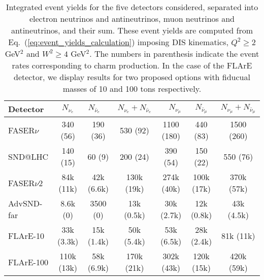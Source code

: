 \begin{table}[t]
  \centering
  \small
  \renewcommand{\arraystretch}{1.70}
\begin{tabularx}{\textwidth}{X|c|c|c|c|c|c}
\toprule
Detector & $\quad$ $N_{\nu_e}$ $\quad$ &$\quad$ $N_{\bar{\nu}_e}$$\quad$   &   $N_{\nu_e} + N_{\bar{\nu}_e}$ &
$\quad$$N_{\nu_\mu}$ $\quad$ & $\quad$ $N_{\bar{\nu}_\mu}$ $\quad$  &   $N_{\nu_\mu} + N_{\bar{\nu}_\mu}$ \\
\midrule
\midrule
FASER$\nu$  & 340 (56)    & 190 (36)  & 530 (92)  &  1100 (180)  &  440 (83)  &  1500 (260) \\
SND@LHC  &  140 (15)  & 60 (9)    & 200 (24)   &  390 (54) & 150 (22)   &  550  (76)\\
\midrule
\midrule
FASER$\nu$2  & 84k (11k)   & 42k (6.6k)   & 130k (19k)  & 274k (40k)  & 100k (17k)    & 370k (57k)   \\
AdvSND-far  &  8.6k (0)  & 3500 (0)   & 13k (0.5k)  & 30k (2.7k)  & 12k (0.8k)   & 43k (4.5k)   \\
FLArE-10 & 33k (3.3k) & 15k (1.4k)   &  50k (5.4k) &  53k (6.5k)&   28k (2.4k) &   81k (11k) \\
FLArE-100 &   110k (13k)         &    58k (6.9k)         &       170k (21k)       &   302k (43k)      &  120k (15k)    &  420k (59k)  \\
  \bottomrule
\end{tabularx}
\vspace{0.2cm}
\caption{\small Integrated event yields for the five detectors considered,
  separated into electron neutrinos and antineutrinos,
  muon neutrinos and antineutrinos, and their sum.
  These event yields are computed from Eq.~(\ref{eq:event_yields_calculation})
  imposing DIS kinematics, $Q^2 \ge 2$ GeV$^2$ and $W^2 \ge 4$ GeV$^2$.
 The numbers in parenthesis indicate the event rates corresponding to charm
 production.
 In the case of the FLArE detector, we display results for two proposed
 options with fiducual masses of 10 and 100 tons respectively.
  \label{tab:integrated_rates}
}
\end{table}

